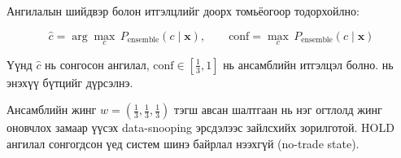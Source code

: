Ангилалын шийдвэр болон итгэлцлийг доорх томьёогоор тодорхойлно:

\begin{equation}
\hat{c} = \arg\max_{c}\, P_{\text{ensemble}}(c \mid \mathbf{x}), \qquad
\text{conf} = \max_{c}\, P_{\text{ensemble}}(c \mid \mathbf{x})
\label{eq:decision_rule}
\end{equation}

\noindent Үүнд $\hat{c}$ нь сонгосон ангилал, $\text{conf} \in [\tfrac13, 1]$ нь ансамблийн итгэлцэл болно.  нь энэхүү бүтцийг дүрсэлнэ.

Ансамблийн жинг $w=(\tfrac13,\tfrac13,\tfrac13)$ тэгш авсан шалтгаан нь нэг огтлолд жинг оновчлох замаар үүсэх data-snooping эрсдэлээс зайлсхийх зорилготой. HOLD ангилал сонгогдсон үед систем шинэ байрлал нээхгүй (no-trade state).

